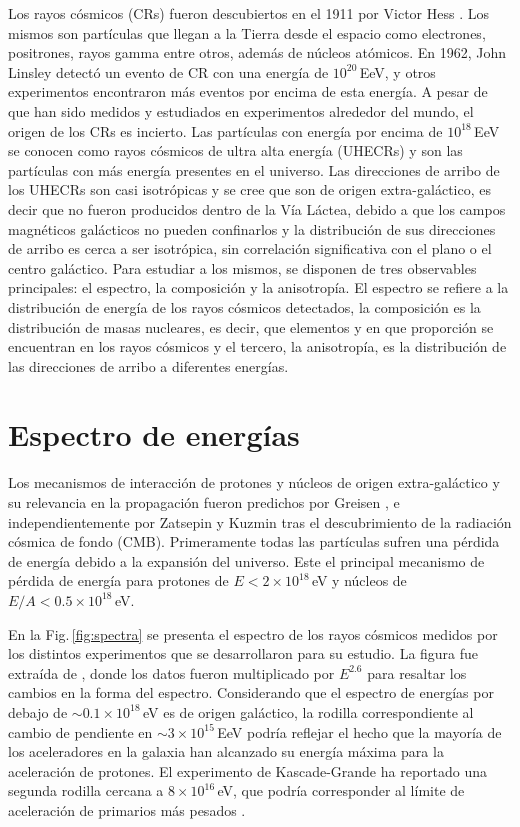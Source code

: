 Los rayos cósmicos (CRs) fueron descubiertos en el 1911 por Victor Hess \cite{hess1912}. Los mismos son partículas que llegan a la Tierra desde el espacio como  electrones, positrones, rayos gamma entre otros, además de núcleos atómicos. En 1962, John Linsley detectó un evento de CR con una energía de  $10^{20}\,$EeV, y otros experimentos  encontraron más eventos por encima de esta energía. A pesar de que han sido medidos y estudiados en experimentos alrededor del mundo, el origen de los CRs es incierto. Las partículas con energía por encima de $10^{18}\,$EeV se conocen como rayos cósmicos de ultra alta energía (UHECRs) y son las partículas con más energía presentes en el universo. Las direcciones de arribo de los UHECRs son casi isotrópicas  \cite{collaboration2013pierre} \cite{data} y se cree que son de origen extra-galáctico, es decir que no fueron producidos dentro de la Vía Láctea, debido a que los campos magnéticos galácticos no pueden confinarlos y la distribución de sus direcciones de arribo es cerca a ser isotrópica, sin correlación significativa con el plano o el centro galáctico. Para estudiar a los mismos, se disponen de tres observables principales: el espectro, la composición y la anisotropía. El espectro se refiere a la distribución de energía de los rayos cósmicos detectados, la composición es la distribución de masas nucleares, es decir, que elementos y en que proporción se encuentran en los rayos cósmicos y el tercero, la anisotropía, es la distribución de las direcciones de arribo a diferentes energías.

\section{Espectro de energías}

Los mecanismos de interacción de protones y núcleos de origen extra-galáctico  y su relevancia en la propagación fueron predichos por Greisen \cite{greisen1966end}, e independientemente por Zatsepin y Kuzmin \cite{zatsepin1966upper} tras el descubrimiento de la radiación cósmica de fondo (CMB). Primeramente todas las partículas sufren una pérdida de energía debido a la expansión del universo. Este el principal mecanismo de pérdida de energía para protones de $E < 2\times 10^{18}\,$eV y núcleos de $E/A < 0.5\times 10^{18}\,$eV. 

En la Fig.\,\ref{fig:spectra} se presenta el espectro de los rayos cósmicos medidos por los distintos experimentos que se desarrollaron para su estudio. La figura fue extraída de \cite{PGD}, donde los datos fueron multiplicado por $E^{2.6}$ para resaltar los cambios en la forma del espectro. Considerando que el espectro de energías por debajo de $\sim 0.1\times 10^{18}\,$eV es de origen galáctico, la rodilla correspondiente al cambio de pendiente en $\sim 3\times10^{15}\,$EeV podría reflejar el hecho que la mayoría de los aceleradores en la galaxia han alcanzado su energía máxima para la aceleración de protones. El experimento de Kascade-Grande ha reportado una segunda rodilla cercana a $8\times10^{16}\,$eV, que podría corresponder al límite de aceleración de primarios más pesados \cite{PGD}.

